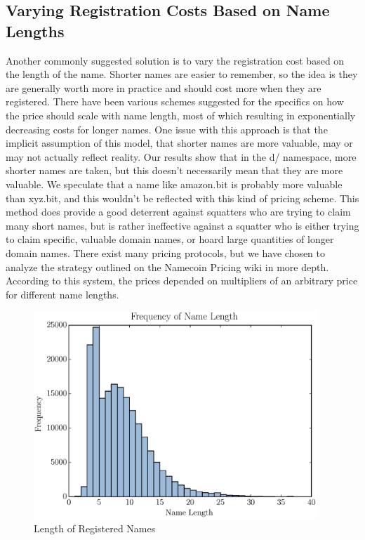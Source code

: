 \subsection{Varying Registration Costs Based on Name Lengths}
    Another commonly suggested solution is to vary the registration cost based on the length of the name. Shorter names are easier to remember, so the idea is they are generally worth more in practice and should cost more when they are registered. There have been various schemes suggested for the specifics on how the price should scale with name length, most of which resulting in exponentially decreasing costs for longer names. One issue with this approach is that the implicit assumption of this model, that shorter names are more valuable, may or may not actually reflect reality. Our results show that in the d/ namespace, more shorter names are taken, but this doesn't necessarily mean that they are more valuable. We speculate that a name like amazon.bit is probably more valuable than xyz.bit, and this wouldn't be reflected with this kind of pricing scheme.  This method does provide a good deterrent against squatters who are trying to claim many short names, but is rather ineffective against a squatter who is either trying to claim specific, valuable domain names, or hoard large quantities of longer domain names. 
    There exist many pricing protocols, but we have chosen to analyze the strategy outlined on the Namecoin Pricing wiki in more depth. According to this system, the prices depended on multipliers of an arbitrary price for different name lengths. 

\begin{figure}
  \centering
  \includegraphics[width=0.95\textwidth]{figures/name_length_histogram}
  \caption{Length of Registered Names}
  \label{fig:nameLength}
\end{figure}

